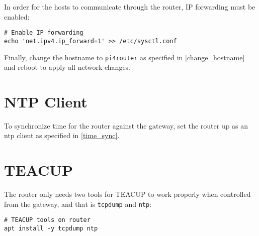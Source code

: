 In order for the hosts to communicate through the router, IP forwarding must be enabled:

\begin{verbatim}
# Enable IP forwarding
echo 'net.ipv4.ip_forward=1' >> /etc/sysctl.conf
\end{verbatim}

Finally, change the hostname to \lstinline{pi4router} as specified in \ref{change_hostname} and reboot to apply all network changes.


\section{NTP Client}

To synchronize time for the router against the gateway, set the router up as an \gls{ntp} client as specified in \ref{time_sync}.


\section{TEACUP}

The router only needs two tools for TEACUP to work properly when controlled from the gateway, and that is \lstinline{tcpdump} and \lstinline{ntp}:

\begin{verbatim}
# TEACUP tools on router
apt install -y tcpdump ntp
\end{verbatim}